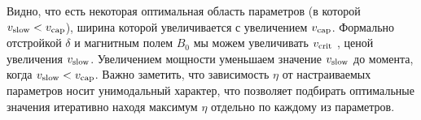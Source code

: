Видно, что есть некоторая оптимальная область параметров (в которой $v_{\textnormal{slow}} < v_{\textnormal{cap}}$), ширина которой увеличивается с увеличением $v_{\textnormal{cap}}$. Формально отстройкой $\delta$ и магнитным полем $B_0$ мы можем увеличивать $v_{\textnormal{crit}}$ , ценой увеличения $v_{\textnormal{slow}}$. Увеличением мощности уменьшаем значение $v_{\textnormal{slow}}$ до момента, когда $v_{\textnormal{slow}} < v_{\textnormal{cap}}$. Важно заметить, что зависимость $\eta$ от настраиваемых параметров носит унимодальный характер, что позволяет подбирать оптимальные значения итеративно находя максимум $\eta$ отдельно по каждому из параметров. 




